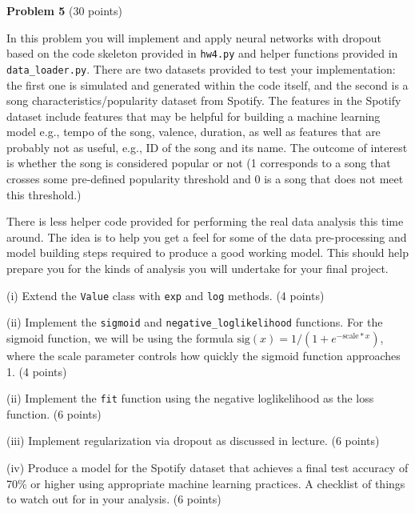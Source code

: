 \documentclass[letterpaper, 11pt]{article}
\begin{document}
{\large\textbf{Problem 5} (30 points)
	
	In this problem you will implement and apply neural networks with dropout based on the code skeleton provided in \texttt{hw4.py} and helper functions  provided in \texttt{data\_loader.py}. There are two datasets provided to test your implementation: the first one is simulated and generated within the code itself, and the second is a song characteristics/popularity dataset from Spotify. The features in the Spotify dataset include features that may be helpful for building a machine learning model e.g., tempo of the song, valence, duration, as well as features that are probably not as useful, e.g., ID of the song and its name. The outcome of interest is whether the song is considered popular or not (1 corresponds to a song that crosses some pre-defined popularity threshold and 0 is a song that does not meet this threshold.)
	
	There is less helper code provided for performing the real data analysis this time around. The idea is to help you get a feel for some of the data pre-processing and model building steps required to produce a good working model. This should help prepare you for the kinds of analysis you will undertake for your final project.
	
	
	(i) Extend the \texttt{Value} class with \texttt{exp} and \texttt{log} methods. (4 points)
	
	(ii) Implement the \texttt{sigmoid} and \texttt{negative\_loglikelihood} functions. For the sigmoid function, we will be using the  formula $\text{sig}(x) = 1/(1+e^{-\text{scale}*x})$, where the scale parameter controls how quickly the sigmoid function approaches 1. (4 points)
	
	(ii) Implement the \texttt{fit} function using the negative loglikelihood as the loss function. (6 points)
	
	(iii) Implement regularization via dropout as discussed in lecture.  (6 points)
	
	(iv) Produce a model for the Spotify dataset that achieves a final test accuracy of 70\% or higher using appropriate machine learning practices. A checklist of things to watch out for in your analysis. (6 points)
	
}
\end{document}
